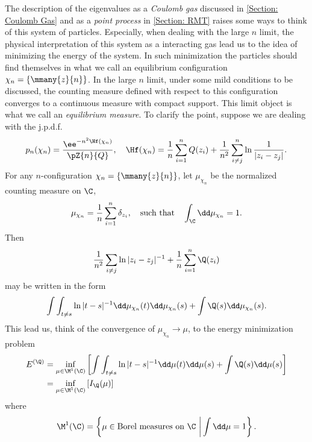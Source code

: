 The description of the eigenvalues as a \textit{Coulomb gas} discussed in \autoref{Section: Coulomb Gas} and as a \textit{point process} in \autoref{Section: RMT} raises some ways to think of this system of particles. Especially, when dealing with the large $n$ limit, the physical interpretation of this system as a interacting gas lead us to the idea of minimizing the energy of the system. In such minimization the particles should find themselves in what we call an equilibrium configuration  $\chi_n = \{\mmany{z}{n}\}$. In the large $n$ limit, under some mild conditions to be discussed, the counting measure defined with respect to this configuration converges to a continuous measure with compact support. This limit object is what we call an \textit{equilibrium measure}. To clarify the point, suppose we are dealing with the j.p.d.f.
\begin{equation} \label{Equation: Equilibrium gas}
	p_n(\chi_n) = \frac{\ee^{- n^2 \Hf(\chi_n)}}{\pZ{n}{Q}}, \quad \Hf(\chi_n) = \frac{1}{n} \sum_{i = 1}^{n} Q(z_i) + \frac{1}{n^2} \sum_{i \neq j}^{n} \ln{\frac{1}{|z_i - z_j|}}. 
\end{equation}
For any $n$-configuration ${\chi_n} = \{\mmany{z}{n}\}$, let $\mu_{\chi_n}$ be the normalized counting measure on $\C$,
\begin{equation}
	\mu_{\chi_n} = \frac{1}{n} \sum_{i=1}^{n} \delta_{z_i}, \quad \text{such that} \quad \int_{\C} \dd \mu_{\chi_n} = 1.
 \end{equation} 
 Then
\begin{equation}
	\frac{1}{n^2} \sum_{i \neq j} \ln{|z_i - z_j|^{-1}} + \frac{1}{n} \sum_{i=1}^n \Q(z_i) 
\end{equation}
may be written in the form 
\begin{equation}
	\int \int_{t \neq s} \ln |t - s|^{-1} \dd \mu_{\chi_n}(t) \dd \mu_{\chi_n}(s) + \int \Q(s) \dd  \mu_{\chi_n} (s).
\end{equation}
This lead us, think of the convergence of $\mu_{\chi_n} \rightarrow \mu$, to the energy minimization problem 
\begin{align}
	E^{(\Q)} & = \inf_{\mu \in \M^1(\C)} \left[ \int \int_{t \neq s} \ln |t - s|^{-1} \dd \mu(t) \dd \mu(s) + \int \Q(s) \dd  \mu(s) \right] \\ & = \inf_{\mu \in \M^1(\C)} \left[ I_\Q(\mu) \right]
\end{align}
where
\begin{equation}
	\M^1(\C) = \left\{ \mu \in \text{Borel measures on} \ \C \ \bigg| \int \dd \mu = 1 \right\}.
\end{equation}

